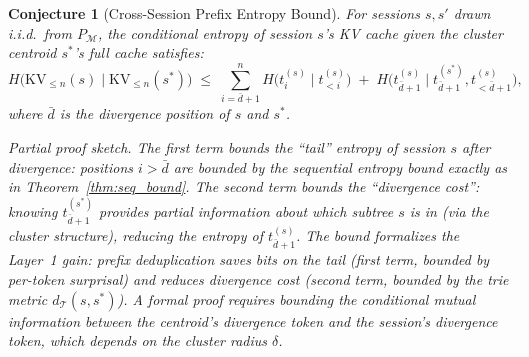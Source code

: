 \documentclass[11pt]{article}
\newtheorem{conjecture}{Conjecture}
\begin{document}
\begin{conjecture}[Cross-Session Prefix Entropy Bound]
\label{conj:cross_session}
For sessions $s, s'$ drawn i.i.d.\ from $P_{\mathcal{M}}$, the conditional
entropy of session $s$'s KV cache given the cluster centroid $s^*$'s full
cache satisfies:
\[
  H\bigl(\mathrm{KV}_{\leq n}(s) \mid \mathrm{KV}_{\leq n}(s^*)\bigr)
  \;\leq\;
  \sum_{i=\bar{d}+1}^{n} H\bigl(t_i^{(s)} \mid t_{<i}^{(s)}\bigr)
  \;+\; H\bigl(t_{\bar{d}+1}^{(s)} \mid t_{\bar{d}+1}^{(s^*)}, t_{<\bar{d}+1}^{(s)}\bigr),
\]
where $\bar{d}$ is the divergence position of $s$ and $s^*$.

\emph{Partial proof sketch.}
The first term bounds the ``tail'' entropy of session $s$ after divergence:
positions $i > \bar{d}$ are bounded by the sequential entropy bound exactly as in
Theorem~\ref{thm:seq_bound}.  The second term bounds the ``divergence cost'':
knowing $t_{\bar{d}+1}^{(s^*)}$ provides partial information about which subtree $s$
is in (via the cluster structure), reducing the entropy of $t_{\bar{d}+1}^{(s)}$.
The bound formalizes the Layer~1 gain: prefix deduplication saves bits on the tail
(first term, bounded by per-token surprisal) and reduces divergence cost (second term,
bounded by the trie metric $d_{\mathcal{T}}(s, s^*)$).  A formal proof requires
bounding the conditional mutual information between the centroid's divergence token
and the session's divergence token, which depends on the cluster radius $\delta$.
\end{conjecture}
\end{document}
